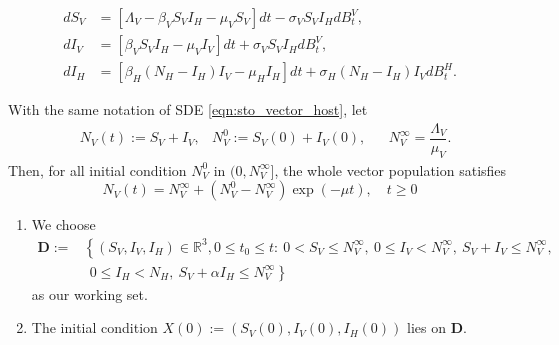 \begin{equation} \label{eqn:sto_vector_host}
    \begin{aligned}
        d S_V &= 
            \left [
                \Lambda_V - \beta_V S_V I_H - \mu_V S_V 
            \right ] dt
            - \sigma_V S_V I_H dB_t^V,
            \\
        d I_V &= 
            \left [
               \beta_V S_V I_H - \mu_V I_V 
            \right ]
            dt 
            + \sigma_V S_V I_H dB_t^V,
            \\
        d I_H &= 
            \left [
                \beta_H (N_H - I_H) I_V - \mu_H I_H
            \right ] dt
            + \sigma_H (N_H - I_H) I_V d B^H_t .
   \end{aligned}
\end{equation}
%
%
\begin{lemma} \label{lem:exponential_growth}
    With the same notation of SDE \eqref{eqn:sto_vector_host},
    let 
    \begin{equation*}
        \begin{aligned}
            & N_V(t):= S_V + I_V,
            & N_V^0 := S_V(0) + I_V(0),
            &&  N_V^{\infty}= \dfrac{\Lambda_V}{\mu_V}.
        \end{aligned}
    \end{equation*}
    Then, for all initial condition $N_V ^ 0 $ in $(0, N_V ^ \infty]$,
    the whole vector population satisfies
    $$
        N_V(t) = 
            N_V ^ \infty
            +
            \left(
                N_V ^ 0 - N_V ^ \infty
            \right)
            \exp(-\mu t), \quad t \geq 0
    $$
\end{lemma}

\begin{assumption}[] \label{ass:regularity}
    \begin{enumerate}[({A}-1)]
        \item We choose
        \begin{align*}
            \mathbf{D} :=& 
            \left \lbrace 
                \left( 
                    S_{V},I_{V},I_{H} 
                \right)
                \in 
                \mathbb{R}^{3}, 0\leq t_{0}\leq t:
                \ 0<S_{V}\leq N_{V}^{\infty}, 
                \ 0\leq I_{V}< N_{V}^{\infty}, 
                \ S_{V} + I_{V} \leq N_{V}^{\infty},
            \right.\\
            &\ \left.
                \ 0\leq I_{H}< N_{H},		 
                \ S_{V} + \alpha I_{H} \leq N_{V}^{\infty}
            \right\rbrace
        \end{align*}
        as our working set.
        \item 
            The initial condition 
            $
                X(0) := 
                    \left(
                        S_{V}(0), I_{V}(0), 
                        I_{H}(0)
                    \right)$ 
            lies on
            $\mathbf{D}$.
    \end{enumerate}
\end{assumption}